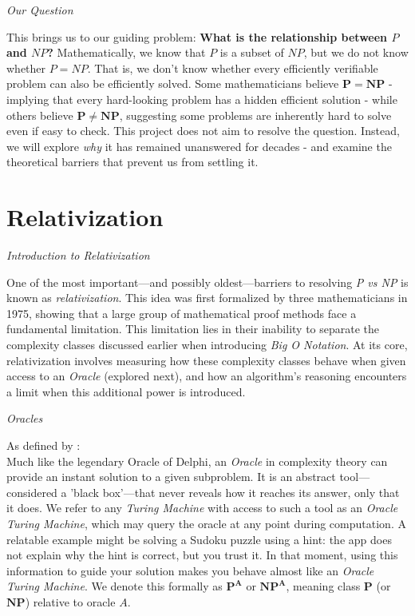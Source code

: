 \documentclass[12pt]{report}
\begin{document}
\begin{center}
    \vspace{0cm}
    {\Large\itshape Our Question\par}
\end{center}
This brings us to our guiding problem: \textbf{What is the relationship between $P$ and $NP$?}
Mathematically, we know that $P$ is a subset of $NP$, but we do not know whether $P = NP$. That is, we don't know whether every efficiently verifiable problem can also be efficiently solved.
Some mathematicians believe $\mathbf{P = NP}$ - implying that every hard-looking problem has a hidden efficient solution - while others believe $\mathbf{P \neq NP}$, suggesting some problems are inherently hard to solve even if easy to check.
This project does not aim to resolve the question. Instead, we will explore \textit{why} it has remained unanswered for decades - and examine the theoretical barriers that prevent us from settling it.

\section*{Relativization}
\begin{center}
    \vspace{0cm}
    {\Large\itshape Introduction to Relativization\par}
\end{center}
One of the most important—and possibly oldest—barriers to resolving \textit{P vs NP} is known as \textit{relativization}.
This idea was first formalized by three mathematicians in 1975, showing that a large group of mathematical proof methods face a fundamental limitation.
This limitation lies in their inability to separate the complexity classes discussed earlier when introducing \textit{Big O Notation}.
At its core, relativization involves measuring how these complexity classes behave when given access to an \textit{Oracle} (explored next), and how an algorithm's reasoning encounters a limit when this additional power is introduced.

\begin{center}
    \vspace{0cm}
    {\Large\itshape Oracles\par}
\end{center}
As defined by \cite{arora2009}:\\
Much like the legendary Oracle of Delphi, an \textit{Oracle} in complexity theory can provide an instant solution to a given subproblem.
It is an abstract tool—considered a 'black box'—that never reveals how it reaches its answer, only that it does.
We refer to any \textit{Turing Machine} with access to such a tool as an \textit{Oracle Turing Machine}, which may query the oracle at any point during computation.
A relatable example might be solving a Sudoku puzzle using a hint: the app does not explain why the hint is correct, but you trust it.
In that moment, using this information to guide your solution makes you behave almost like an \textit{Oracle Turing Machine}.
We denote this formally as $\mathbf{P^A}$ or $\mathbf{NP^A}$, meaning class $\mathbf{P}$ (or $\mathbf{NP}$) relative to oracle $A$.
\end{document}
